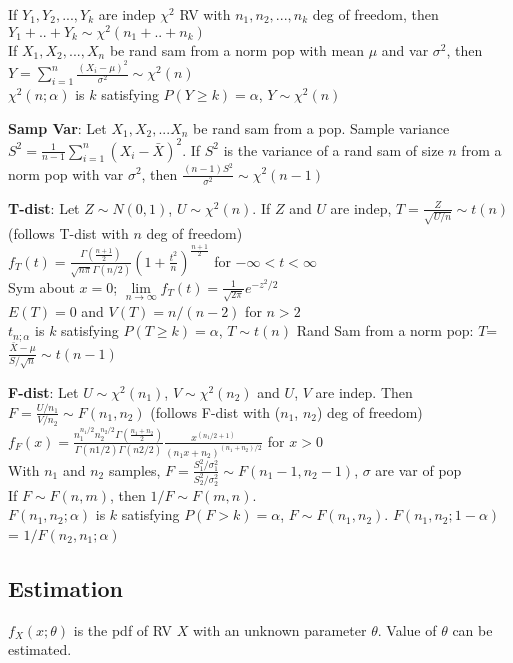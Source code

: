 \documentclass[a4paper,landscape]{article}
\newcommand{\rntopic}[1]{\vspace{-2.0em}\subsection*{#1}\vspace{-1.0em}}
\newcommand{\rnname}[1]{\textbf{#1}}
\begin{document}
\begin{multicols*}{4}
\begin{flatitemize}
If $Y_1, Y_2, ..., Y_k$ are indep $\chi^2$ RV with $n_1, n_2, ... , n_k$ deg of freedom, then $Y_1 + .. + Y_k \sim \chi^2(n_1 + .. + n_k)$ \\
If $X_1, X_2, ..., X_n$ be rand sam from a norm pop with mean $\mu$ and var $\sigma^2$, then $Y=\sum_{i=1}^{n} \frac{(X_i - \mu)^2}{\sigma^2} \sim \chi^2(n)$ \\
$\chi^2(n;\alpha)$ is $k$ satisfying $P(Y \geq k) = \alpha$, $Y \sim \chi^2(n)$
\item \rnname{Samp Var}: Let $X_1, X_2, ... X_n$ be rand sam from a pop. Sample variance $S^2 = \frac{1}{n-1}\sum_{i=1}^{n}(X_i - \bar X)^2$.
If $S^2$ is the variance of a rand sam of size $n$ from a norm pop with var $\sigma^2$, then $\frac{(n-1)S^2}{\sigma^2} \sim \chi^2(n-1)$
\item \rnname{T-dist}: Let $Z \sim N(0, 1)$, $U \sim \chi^2(n)$. If $Z$ and $U$ are indep, $T = \frac{Z}{\sqrt{U/n}} \sim t(n)$ (follows T-dist with $n$ deg of freedom) \\
$f_T(t) = \frac{\Gamma(\frac{n+1}{2})}{\sqrt{n\pi} \Gamma(n/2)}(1 + \frac{t^2}{n})^{\frac{n+1}{2}}$ for $-\infty < t < \infty$ \\
Sym about $x = 0$; $\lim\limits_{n \rightarrow \infty}f_T(t) = \frac{1}{\sqrt{2\pi}}e^{-z^2/2}$ \\
$E(T) = 0$ and $V(T) = n/(n-2)$ for $n > 2$ \\
$t_{n;\alpha}$ is $k$ satisfying $P(T \geq k) = \alpha$, $T \sim t(n)$
Rand Sam from a norm pop: $T$=$\frac{\bar X - \mu}{S / \sqrt{n}} \sim t(n-1)$
\item \rnname{F-dist}: Let $U \sim \chi^2(n_1)$, $V \sim \chi^2(n_2)$ and $U$, $V$ are indep. Then $F = \frac{U/n_1}{V/n_2} \sim F(n_1, n_2)$ (follows F-dist with ($n_1$, $n_2$) deg of freedom) \\
$f_F(x) = \frac{n_1^{n_1/2}n_2^{n_2/2}\Gamma(\frac{n_1+n_2}{2})}{\Gamma(n1/2)\Gamma(n2/2)} \frac{x^{(n_1/2+1)}}{(n_1x + n_2)^{(n_1+n_2)/2}}$ for $x > 0$ \\
With $n_1$ and $n_2$ samples, $F = \frac{S_1^2/\sigma_1^2}{S_2^2/\sigma_2^2} \sim F(n_1 - 1, n_2 - 1)$, $\sigma$ are var of pop \\
If $F \sim F(n, m)$, then $1/F \sim F(m, n)$. \\
$F(n_1,n_2;\alpha)$ is $k$ satisfying $P(F > k) = \alpha$, $F \sim F(n_1, n_2)$. $F(n_1, n_2;1-\alpha)$ = $1/F(n_2,n_1;\alpha)$
\end{flatitemize}
\begin{flatitemize}
\rntopic{Estimation}
\item $f_X(x;\theta)$ is the pdf of RV $X$ with an unknown parameter $\theta$. Value of $\theta$ can be estimated.

\end{flatitemize}
\end{multicols*}
\end{document}
